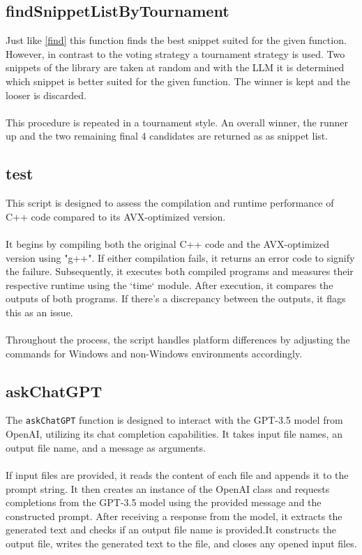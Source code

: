 \documentclass[twocolumn]{article}
\begin{document}
\subsection{findSnippetListByTournament} \label{findTournament}
Just like \ref{find} this function finds the best snippet suited for the given function. However, in contrast to the voting strategy a tournament strategy is used.
Two snippets of the library are taken at random and with the LLM it is determined which snippet is better suited for the given function. The winner is kept and the looser is discarded.\\ 
\\
This procedure is repeated in a tournament style. An overall winner, the runner up and the two remaining final 4 candidates are returned as as snippet list.

\subsection{test} \label{test}
This script is designed to assess the compilation and runtime performance of C++ code compared to its AVX-optimized version.\\ 
\\
It begins by compiling both the original C++ code and the AVX-optimized version using "g++". If either compilation fails, it returns an error code to signify the failure. 
Subsequently, it executes both compiled programs and measures their respective runtime using the `time` module. 
After execution, it compares the outputs of both programs. If there's a discrepancy between the outputs, it flags this as an issue.\\ 
\\
Throughout the process, the script handles platform differences by adjusting the commands for Windows and non-Windows environments accordingly.

\subsection{askChatGPT}
The \texttt{askChatGPT} function is designed to interact with the GPT-3.5 model from OpenAI, utilizing its chat completion capabilities. It takes input file names, an output file name, and a message as arguments.\\ 
\\
If input files are provided, it reads the content of each file and appends it to the prompt string. It then creates an instance of the OpenAI class and requests completions from the GPT-3.5 model using the provided message and the constructed prompt. After receiving a response from the model, it extracts the generated text and checks if an output file name is provided.It constructs the output file, writes the generated text to the file, and closes any opened input files.
\end{document}

